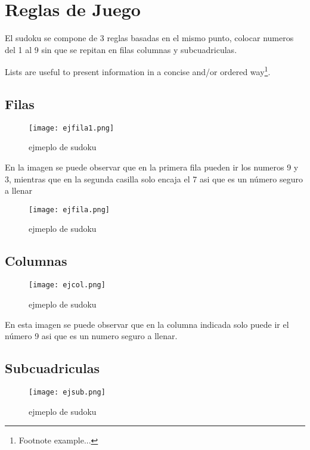 \documentclass[11pt,fleqn]{book} %
\begin{document}

\section{Reglas de Juego}

El sudoku se compone de 3 reglas basadas en el mismo punto, colocar numeros del 1 al 9 sin que se repitan en filas columnas y subcuadriculas.

Lists are useful to present information in a concise and/or ordered way\footnote{Footnote example...}.

\subsection{Filas}

\begin{figure}[H]
\centering\texttt{[image: ejfila1.png]}
\caption{ejmeplo de sudoku}
\end{figure}

En la imagen se puede observar que en la primera fila pueden ir los numeros 9 y 3, mientras que en la segunda casilla solo encaja el 7 asi que es un número seguro a llenar

\begin{figure}[H]
\centering\texttt{[image: ejfila.png]}
\caption{ejmeplo de sudoku}
\end{figure}

\subsection{Columnas}

\begin{figure}[H]
\centering\texttt{[image: ejcol.png]}
\caption{ejmeplo de sudoku}
\end{figure}

En esta imagen se puede observar que en la columna indicada solo puede ir el número 9 asi que es un numero seguro a llenar.

\subsection{Subcuadriculas}

\begin{figure}[H]
\centering\texttt{[image: ejsub.png]}
\caption{ejmeplo de sudoku}
\end{figure}
\end{document}
